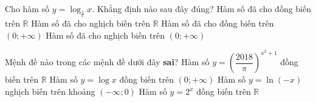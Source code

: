\begin{ex}%
	Cho hàm số $y=\log_{\tfrac{1}{\mathrm{e}}} x$.  Khẳng định nào sau đây đúng?
	 \choice
		{Hàm số đã cho đồng  biến trên $\mathbb{R}$}
		{Hàm số  đã cho nghịch biến trên $\mathbb{R}$}
		{Hàm số đã cho đồng biến  trên $(0;+\infty)$}
		{\True  Hàm số đã cho nghịch biến trên $(0;+\infty)$}
\end{ex}

\begin{ex}%
	Mệnh đề nào trong các mệnh đề dưới đây  \textbf{sai}?
	\choice 
		{Hàm số $ y={{\left(\dfrac{2018}{\pi } \right)}^{{x^2}+1}}$ đồng  biến trên $\mathbb{R}$}
		{Hàm số $ y=\log x$ đồng biến  trên $( 0;+\infty)$}
		{\True Hàm  số $ y=\ln( -x)$ nghịch biến trên khoảng $( -\infty;0)$}
		{Hàm số $ y={2^x}$ đồng biến trên  $\mathbb{R}$}
\end{ex}

